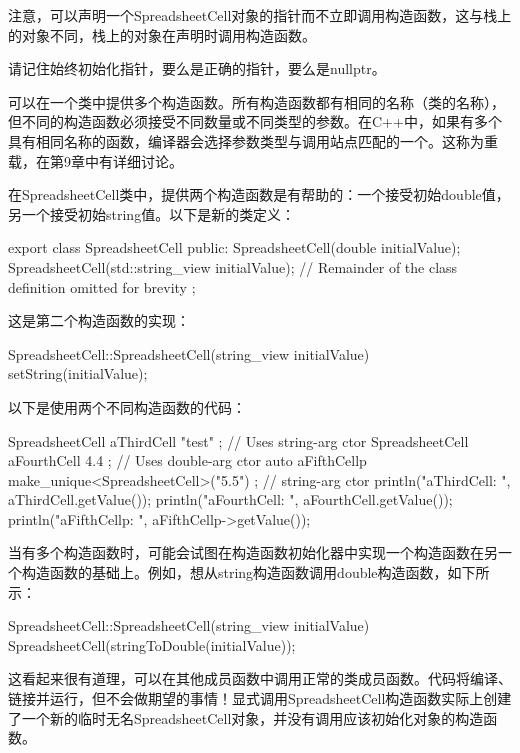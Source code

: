 注意，可以声明一个SpreadsheetCell对象的指针而不立即调用构造函数，这与栈上的对象不同，栈上的对象在声明时调用构造函数。

请记住始终初始化指针，要么是正确的指针，要么是nullptr。


可以在一个类中提供多个构造函数。所有构造函数都有相同的名称（类的名称），但不同的构造函数必须接受不同数量或不同类型的参数。在C++中，如果有多个具有相同名称的函数，编译器会选择参数类型与调用站点匹配的一个。这称为重载，在第9章中有详细讨论。

在SpreadsheetCell类中，提供两个构造函数是有帮助的：一个接受初始double值，另一个接受初始string值。以下是新的类定义：

\begin{cpp}
export class SpreadsheetCell
{
    public:
        SpreadsheetCell(double initialValue);
        SpreadsheetCell(std::string_view initialValue);
        // Remainder of the class definition omitted for brevity
};
\end{cpp}

这是第二个构造函数的实现：

\begin{cpp}
SpreadsheetCell::SpreadsheetCell(string_view initialValue)
{
    setString(initialValue);
}
\end{cpp}

以下是使用两个不同构造函数的代码：

\begin{cpp}
SpreadsheetCell aThirdCell { "test" }; // Uses string-arg ctor
SpreadsheetCell aFourthCell { 4.4 }; // Uses double-arg ctor
auto aFifthCellp { make_unique<SpreadsheetCell>("5.5") }; // string-arg ctor
println("aThirdCell: {}", aThirdCell.getValue());
println("aFourthCell: {}", aFourthCell.getValue());
println("aFifthCellp: {}", aFifthCellp->getValue());
\end{cpp}

当有多个构造函数时，可能会试图在构造函数初始化器中实现一个构造函数在另一个构造函数的基础上。例如，想从string构造函数调用double构造函数，如下所示：

\begin{cpp}
SpreadsheetCell::SpreadsheetCell(string_view initialValue)
{
    SpreadsheetCell(stringToDouble(initialValue));
}
\end{cpp}

这看起来很有道理，可以在其他成员函数中调用正常的类成员函数。代码将编译、链接并运行，但不会做期望的事情！显式调用SpreadsheetCell构造函数实际上创建了一个新的临时无名SpreadsheetCell对象，并没有调用应该初始化对象的构造函数。

